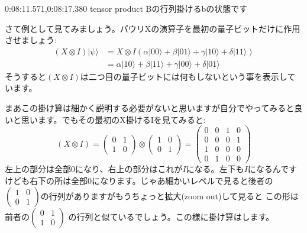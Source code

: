 0:08:11.571,0:08:17.380
tensor product Bの行列掛けるbの状態です
\fi

さて例として見てみましょう。パウリXの演算子を最初の量子ビットだけに作用させましょう:
\begin{equation}
\begin{aligned}
(X \otimes I)|\psi\rangle &=X \otimes I(\alpha|00\rangle+\beta|01\rangle+\gamma|10\rangle+\delta|11\rangle) \\
&=\alpha|10\rangle+\beta|11\rangle+\gamma|00\rangle+\delta|01\rangle
\end{aligned}
\end{equation}
そうすると$(X \otimes I)$は二つ目の量子ビットには何もしないという事を表示しています。

まあこの掛け算は細かく説明する必要がないと思いますが自分でやってみると良いと思います。でもその最初のX掛けるIを見てみると:
\begin{equation}
(X \otimes I)=\left(\begin{array}{ll}
0 & 1 \\
1 & 0
\end{array}\right) \otimes\left(\begin{array}{ll}
1 & 0 \\
0 & 1
\end{array}\right)=\left(\begin{array}{llll}
0 & 0 & 1 & 0 \\
0 & 0 & 0 & 1 \\
1 & 0 & 0 & 0 \\
0 & 1 & 0 & 0
\end{array}\right)
\end{equation}
左上の部分は全部0になり、右上の部分はこれが$I$になる。左下も$I$になるんですけども右下の所は全部0になります。じゃあ細かいレベルで見ると後者の$\left(\begin{array}{ll}
1 & 0 \\
0 & 1
\end{array}\right)$の行列がありますがもうちょっと拡大(zoom out)して見ると
この形は前者の$\left(\begin{array}{ll}
0 & 1 \\
1 & 0
\end{array}\right)$ の行列と似ているでしょう。この様に掛け算はします。
